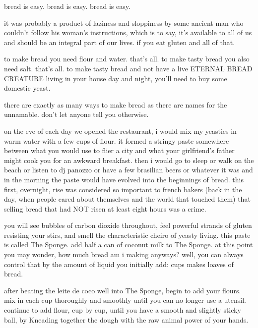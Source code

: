 \begin{algorithm}

  \item bread is easy. bread is easy. bread is easy.

  \item it was probably a product of laziness and sloppiness by some
  ancient man who couldn't follow his woman's instructions,
  which is to say, it's available to all of us and should be an
  integral part of our lives. if you eat gluten and all of that.

  \item to make bread you need flour and water. that's all. to make
  tasty bread you also need salt. that's all. to make tasty bread
  and not have a live ETERNAL BREAD CREATURE living in your house day
  and night, you'll need to buy some domestic yeast.

  \item there are exactly as many ways to make bread as there are
  names for the unnamable. don't let anyone tell you otherwise.

\end{algorithm}

on the eve of each day we opened the restaurant, i would mix my
yeasties in warm water with a few cups of flour. it formed a stringy
paste somewhere between what you would use to flier a city and what
your girlfriend's father might cook you for an awkward
breakfast. then i would go to sleep or walk on the beach or listen to
dj panozzo or have a few brasilian beers or whatever it was and in the
morning the paste would have evolved into the beginnings of
bread. this first, overnight, rise was considered so important to
french bakers (back in the day, when people cared about themselves and
the world that touched them) that selling bread that had NOT risen at
least eight hours was a crime.

you will see bubbles of carbon dioxide throughout, feel powerful
strands of gluten resisting your stirs, and smell the characteristic
\gls{cheiro} of yeasty living. this
paste is called The Sponge. add half a can of coconut milk to The
Sponge. at this point you may wonder, how much bread am i making
anyways? well, you can always control that by the amount of liquid you
initially add:  cups makes  loaves of bread.

after beating the \gls{leite de coco} well into The Sponge, begin to add your flours. mix in each cup
thoroughly and smoothly until you can no longer use a
utensil. continue to add flour, cup by cup, until you have a smooth
and slightly sticky ball, by Kneading together the dough with the raw
animal power of your hands.

